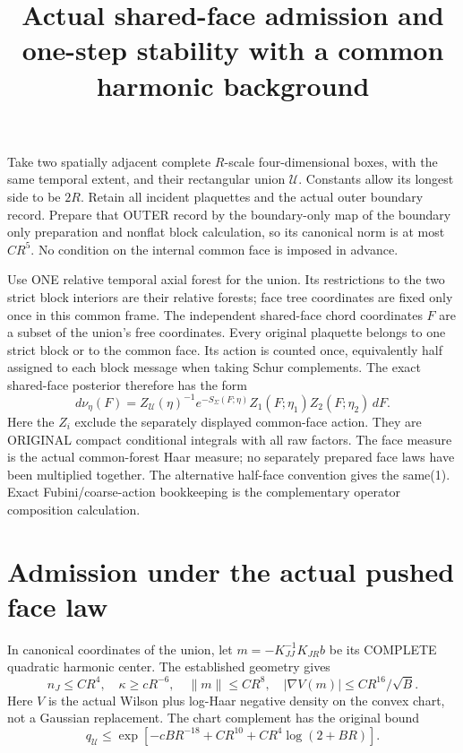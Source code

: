 \documentclass{article}
\title{Actual shared-face admission and one-step stability with a common harmonic background}\author{}\date{}
\begin{document}
\maketitle
Take two spatially adjacent complete $R$-scale four-dimensional boxes, with the same temporal extent, and their rectangular union $\mathcal U$. Constants allow its longest side to be $2R$. Retain all incident plaquettes and the actual outer boundary record. Prepare that OUTER record by the boundary-only map of the boundary only preparation and nonflat block calculation, so its canonical norm is at most $CR^5$. No condition on the internal common face is imposed in advance.

Use ONE relative temporal axial forest for the union. Its restrictions to the two strict block interiors are their relative forests; face tree coordinates are fixed only once in this common frame. The independent shared-face chord coordinates $F$ are a subset of the union's free coordinates. Every original plaquette belongs to one strict block or to the common face. Its action is counted once, equivalently half assigned to each block message when taking Schur complements. The exact shared-face posterior therefore has the form
\[
 d\nu_\eta(F)=Z_{\mathcal U}(\eta)^{-1}
 e^{-S_{\Sigma}(F;\eta)}Z_1(F;\eta_1)Z_2(F;\eta_2)\,dF.                 \tag{1}
\]
Here the $Z_i$ exclude the separately displayed common-face action. They are ORIGINAL compact conditional integrals with all raw factors. The face measure is the actual common-forest Haar measure; no separately prepared face laws have been multiplied together. The alternative half-face convention gives the same(1). Exact Fubini/coarse-action bookkeeping is the complementary operator composition calculation.

\section*{Admission under the actual pushed face law}
In canonical coordinates of the union, let $m=-K_{JJ}^{-1}K_{JR}b$ be its COMPLETE quadratic harmonic center. The established geometry gives
\[
 n_J\le CR^4,\quad \kappa\ge cR^{-6},\quad \|m\|\le CR^8,
 \quad |\nabla V(m)|\le CR^{16}/\sqrt B.               \tag{2}
\]
Here $V$ is the actual Wilson plus log-Haar negative density on the convex chart, not a Gaussian replacement. The chart complement has the original bound
\[
 q_{\mathcal U}\le
 \exp[-cBR^{-18}+CR^{10}+CR^4\log(2+BR)].              \tag{3}
\]
\end{document}
